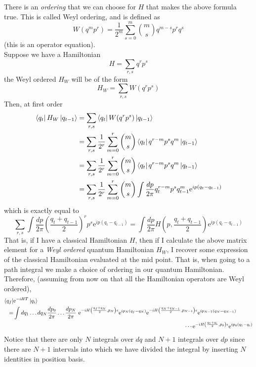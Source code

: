 \documentclass[11pt]{article}
\newcommand{\e}{\mathrm{e}}
\numberwithin{equation}{section}
\begin{document}
There is an \textit{ordering} that we can    choose for \(H\) that makes the above formula true. This is called Weyl ordering, and is defined as 
\begin{equation*}
    W(q^mp^r) = \frac{1}{2^m} \sum_{s=0}^m\binom{m}{s} q^{m-s} p^r q^s
\end{equation*}
(this is an operator equation).\\
Suppose we have a Hamiltonian 
\begin{equation*}
    H = \sum_{r,s} q^r p^s
\end{equation*}
the Weyl ordered \(H_W\) will be of the form 
\begin{equation*}
    H_W = \sum_{r,s} W(q^r p^s)
\end{equation*}
Then, at first order 
\begin{align*}
    \bra{q_t}H_W \ket{q_{t-1}} &= \sum_{r,s} \bra{q_t}W(q^r p^s)\ket{q_{t-1}}\\
    & = \sum_{r,s} \frac{1}{2^r}  \sum_{m=0}^r \binom{m}{s} \bra{q_t} q^{r-m} p^s q^m\ket{q_{t-1}}\\
    & = \sum_{r,s} \frac{1}{2^r}  \sum_{m=0}^r \binom{m}{s} \bra{q_t} q^{r-m} p^s q^m\ket{q_{t-1}}\\
    & = \sum_{r,s} \frac{1}{2^r}  \sum_{m=0}^r \binom{m}{s} \int \frac{dp}{2\pi} q_t^{r-m}p^s q_{t-1}^m \e^{ip(q_t - q_{t-1})}
\end{align*}
which is exactly equal to 
\begin{equation*}
    \sum_{r,s} \int \frac{dp}{2\pi}\left( \frac{q_t + q_{t-1}}{2}\right)^{r}p^s \e^{ip(q_t - q_{t-1})} = \int \frac{dp}{2\pi} H\left(p, \frac{q_t + q_{t-1}}{2}  \right)\e^{ip(q_t - q_{t-1})}
\end{equation*}
That is, if I have a classical Hamiltonian \(H\), then if I calculate the above matrix element for a \textit{Weyl ordered} quantum Hamiltonian \(H_W\), I recover some expression of the classical Hamiltonian evaluated at the mid point. That is, when going to a path integral we make a choice of ordering in our quantum Hamiltonian.\\

Therefore, (assuming from now on that all the Hamiltonian operators are Weyl ordered), 
\begin{align*}
    \bra{q_f} &\e^{-iHT}\ket{q_i} \\=& \int dq_1 \ldots dq_N \frac{dp_0}{2\pi} \ldots \frac{dp_N}{2\pi} ~\e^{-iH\left(\frac{q_f + q_N}{2}, p_N\right)\epsilon}\e^{ip_N (q_f - q_N)}\e^{-iH\left(\frac{q_N + q_{N-1}}{2}, p_{N-1}\right)\epsilon}\e^{ip_{N-1} (q_N - q_{N-1})}\\
    &~~~~~~~~~~~~~~~~~~~~~~~~~~~~~~~~~~~~~~~~~~~~~~~~~~~~~~~~~~~~~~~~~~~~~~~~~~~~~~~~~~~~~~~~~~~\cdots  \e^{-iH\left(\frac{q_1 + q_{i}}{2}, p_0\right)\epsilon}\e^{ip_{0} (q_1 - q_{i})}
\end{align*}
Notice that there are only \(N\) integrals over \(dq\) and \(N+1\) integrals over \(dp\) since there are \(N+1\) intervals into which we have divided the integral by inserting \(N\) identities in position basis.\\
\end{document}
